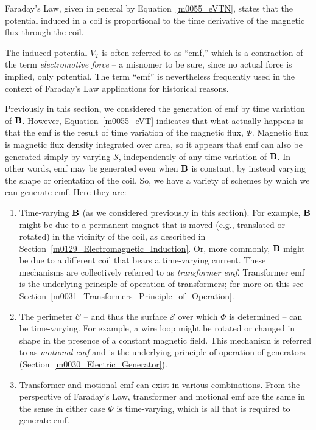 \begin{mdframed}[backgroundcolor=yellow!20,nobreak=true] 
Faraday's Law, given in general by Equation~\ref{m0055_eVTN}, states that the potential induced in a coil is proportional to the time derivative of the magnetic flux through the coil.
\end{mdframed}

The induced potential $V_T$ is often referred to as ``emf,'' 
which is a contraction of the term {\it electromotive force} -- a misnomer to be sure, since no actual force is implied, only potential.
The term ``emf'' is nevertheless frequently used in the context of Faraday's Law applications for historical reasons.
 
Previously in this section, we considered the generation of emf by time variation of ${\bf B}$.
However, Equation~\ref{m0055_eVT} indicates that what actually happens is that the emf is the result of time variation of the magnetic flux, $\Phi$.
Magnetic flux is magnetic flux density integrated over area, so it appears that emf can also be generated simply by varying $\mathcal{S}$, independently of any time variation of ${\bf B}$. 
In other words, emf may be generated even when ${\bf B}$ is constant, by instead varying the shape or orientation of the coil.
So, we have a variety of schemes by which we can generate emf. 
Here they are:
%
\begin{enumerate}
\item Time-varying ${\bf B}$ (as we considered previously in this section).  For example, ${\bf B}$ might be due to a permanent magnet that is moved (e.g., translated or rotated) in the vicinity of the coil, as described in Section~\ref{m0129_Electromagnetic_Induction}.  Or, more commonly, ${\bf B}$ might be due to a different coil that bears a time-varying current.  These mechanisms are collectively referred to as {\it transformer emf}. 
Transformer emf is the underlying principle of operation of transformers; for more on this see Section~\ref{m0031_Transformers_Principle_of_Operation}.
\item The perimeter $\mathcal{C}$ -- and thus the surface $\mathcal{S}$ over which $\Phi$ is determined -- can be time-varying.  For example, a wire loop might be rotated or changed in shape in the presence of a constant magnetic field.  This mechanism is referred to as {\it motional emf}
and is the underlying principle of operation of generators 
(Section~\ref{m0030_Electric_Generator}).
\item Transformer and motional emf can exist in various combinations. From the perspective of Faraday's Law, transformer and motional emf are the same in the sense in either case $\Phi$ is time-varying, which is all that is required to generate emf.
\end{enumerate}

